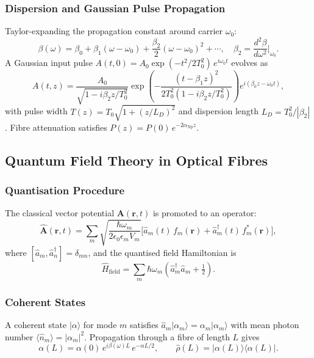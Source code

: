 \documentclass[12pt,a4paper]{article}
\theoremstyle{definition}
\theoremstyle{plain}
\begin{document}
\subsubsection{Dispersion and Gaussian Pulse Propagation}

Taylor-expanding the propagation constant around carrier $\omega_0$:
\begin{equation}
\beta(\omega)=\beta_0+\beta_1(\omega-\omega_0)+\frac{\beta_2}{2}(\omega-\omega_0)^2+\cdots,\quad
\beta_2=\frac{d^2\beta}{d\omega^2}\bigg|_{\omega_0}.
\end{equation}
A Gaussian input pulse $A(t,0)=A_0\exp(-t^2/2T_0^2)\,e^{i\omega_0 t}$ evolves as
\begin{equation}
A(t,z)=\frac{A_0}{\sqrt{1-i\beta_2 z/T_0^2}}\exp\!\left(-\frac{(t-\beta_1 z)^2}{2T_0^2(1-i\beta_2 z/T_0^2)}\right)e^{i(\beta_0 z-\omega_0 t)},
\end{equation}
with pulse width $T(z)=T_0\sqrt{1+(z/L_D)^2}$ and dispersion length $L_D=T_0^2/|\beta_2|$.
Fibre attenuation satisfies $P(z)=P(0)\,e^{-2\alpha_{\mathrm{Np}}z}$.

\subsection{Quantum Field Theory in Optical Fibres}

\subsubsection{Quantisation Procedure}

The classical vector potential $\mathbf{A}(\mathbf{r},t)$ is promoted to an operator:
\begin{equation}
\hat{\mathbf{A}}(\mathbf{r},t)=\sum_m\sqrt{\frac{\hbar\omega_m}{2\epsilon_0\epsilon_m V_m}}
\bigl[\hat{a}_m(t)\,f_m(\mathbf{r})+\hat{a}_m^\dagger(t)\,f_m^*(\mathbf{r})\bigr],
\label{eq:quantisation}
\end{equation}
where $[\hat{a}_m,\hat{a}_n^\dagger]=\delta_{mn}$, and the quantised field Hamiltonian is
\begin{equation}
\hat{H}_{\mathrm{field}}=\sum_m\hbar\omega_m\!\left(\hat{a}_m^\dagger\hat{a}_m+\tfrac{1}{2}\right).
\end{equation}

\subsubsection{Coherent States}

A coherent state $|\alpha\rangle$ for mode $m$ satisfies $\hat{a}_m|\alpha_m\rangle=\alpha_m|\alpha_m\rangle$
with mean photon number $\langle\hat{n}_m\rangle=|\alpha_m|^2$. Propagation through a fibre of
length $L$ gives
\begin{equation}
\alpha(L)=\alpha(0)\,e^{i\beta(\omega)L}\,e^{-\alpha L/2}, \qquad
\hat{\rho}(L)=|\alpha(L)\rangle\langle\alpha(L)|.
\label{eq:coherent_propagation}
\end{equation}
\end{document}
